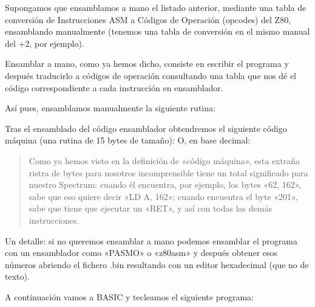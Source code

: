 \documentclass[letterpaper,10pt,spanish]{sphinxmanual}
\begin{document}
Supongamos que ensamblamos a mano el listado anterior, mediante una tabla de conversión de Instrucciones ASM a Códigos de Operación (opcodes) del Z80, ensamblando manualmente (tenemos una tabla de conversión en el mismo manual del +2, por ejemplo).

Ensamblar a mano, como ya hemos dicho, consiste en escribir el programa y después traducirlo a códigos de operación consultando una tabla que nos dé el código correspondiente a cada instrucción en ensamblador.

Así pues, ensamblamos manualmente la siguiente rutina:

\begin{sphinxVerbatim}[commandchars=\\\{\}]
  
  
  
  
  
\end{sphinxVerbatim}

Tras el ensamblado del código ensamblador obtendremos el siguiente código máquina (una rutina de 15 bytes de tamaño):  O, en base decimal: 
\begin{quote}

Como ya hemos visto en la definición de «código máquina», esta extraña ristra de bytes para nosotros incomprensible tiene un total significado para nuestro Spectrum: cuando él encuentra, por ejemplo, los bytes «62, 162», sabe que eso quiere decir «LD A, 162»; cuando encuentra el byte «201», sabe que tiene que ejecutar un «RET», y así con todas las demás instrucciones.
\end{quote}

Un detalle: si no queremos ensamblar a mano podemos ensamblar el programa con un ensamblador como «PASMO» o «z80asm» y después obtener esos números abriendo el fichero .bin resultando con un editor hexadecimal (que no de texto).

A continuación vamos a BASIC y tecleamos el siguiente programa:
\end{document}
